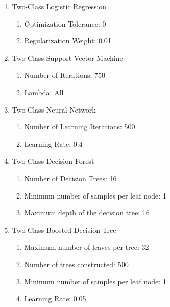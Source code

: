 \begin{enumerate}
    \item{Two-Class Logistic Regression}
    
    \begin{enumerate}
        \item{Optimization Tolerance:} 0
        \item{Regularization Weight:} 0.01
    \end{enumerate}
    
    \item{Two-Class Support Vector Machine}
    
    \begin{enumerate}
        \item{Number of Iterations:} 750
        \item{Lambda:} All
    \end{enumerate}
    
    \item{Two-Class Neural Network}
    
    \begin{enumerate}
        \item{Number of Learning Iterations:} 500
        \item{Learning Rate:} 0.4
    \end{enumerate}
    
    \item{Two-Class Decision Forest}

    \begin{enumerate}
        \item{Number of Decision Trees:} 16
        \item{Minimum number of samples per leaf node:} 1
        \item{Maximum depth of the decision tree:} 16
    \end{enumerate}
    
    \item{Two-Class Boosted Decision Tree}
    
    \begin{enumerate}
        \item{Maximum number of leaves per tree:} 32
        \item{Number of trees constructed:} 500
        \item{Minimum number of samples per leaf node:} 1
        \item{Learning Rate:} 0.05
    \end{enumerate}
    
\end{enumerate}


